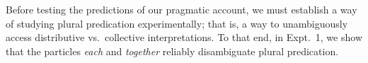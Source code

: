 \documentclass[linguex]{sp}
\newcommand{\ndg}[1]{\textcolor{Green}{[ndg: #1]}}
\begin{document}
Before testing the predictions of our pragmatic account, we must establish a way of studying plural predication experimentally; that is, a way to unambiguously access distributive vs.~collective interpretations. To that end, in Expt.~1, we show that the particles \emph{each} and \emph{together} reliably disambiguate plural predication. 











%
%
\end{document}
